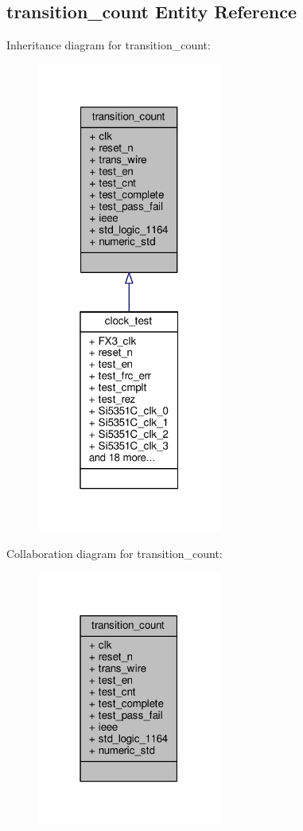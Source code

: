 \subsection{transition\+\_\+count Entity Reference}
\label{classtransition__count}


Inheritance diagram for transition\+\_\+count\+:\nopagebreak
\begin{figure}[H]
\begin{center}
\leavevmode
\includegraphics[width=172pt]{d1/deb/classtransition__count__inherit__graph}
\end{center}
\end{figure}


Collaboration diagram for transition\+\_\+count\+:\nopagebreak
\begin{figure}[H]
\begin{center}
\leavevmode
\includegraphics[width=171pt]{d9/d95/classtransition__count__coll__graph}
\end{center}
\end{figure}
